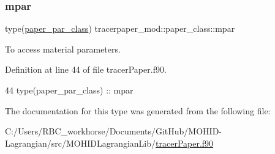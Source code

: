 \subsubsection{\texorpdfstring{mpar}{mpar}}
{\footnotesize\ttfamily type(\mbox{\hyperlink{structtracerpaper__mod_1_1paper__par__class}{paper\+\_\+par\+\_\+class}}) tracerpaper\+\_\+mod\+::paper\+\_\+class\+::mpar\hspace{0.3cm}{\ttfamily [private]}}



To access material parameters. 



Definition at line 44 of file tracer\+Paper.\+f90.


\begin{DoxyCode}
44         \textcolor{keywordtype}{type}(paper\_par\_class)   :: mpar
\end{DoxyCode}


The documentation for this type was generated from the following file\+:\begin{DoxyCompactItemize}
\item 
C\+:/\+Users/\+R\+B\+C\+\_\+workhorse/\+Documents/\+Git\+Hub/\+M\+O\+H\+I\+D-\/\+Lagrangian/src/\+M\+O\+H\+I\+D\+Lagrangian\+Lib/\mbox{\hyperlink{tracer_paper_8f90}{tracer\+Paper.\+f90}}\end{DoxyCompactItemize}
